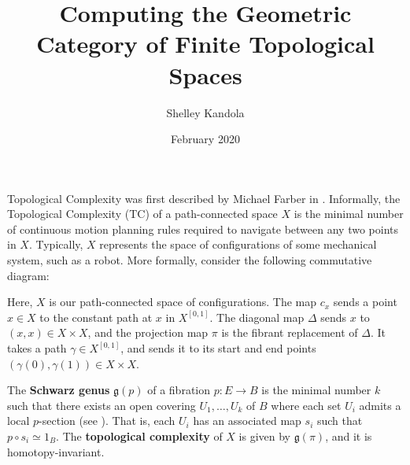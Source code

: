 \documentclass{article}
\title{Computing the Geometric Category of Finite Topological Spaces}
\author{Shelley Kandola}
\date{February 2020}
\begin{document}
\maketitle


Topological Complexity was first described by Michael Farber in \cite{Farber2001}.
Informally, the Topological Complexity (TC) of a path-connected space $X$ is the minimal number of continuous motion planning rules required to navigate between any two points in $X$. Typically, $X$ represents the space of configurations of some mechanical system, such as a robot.
More formally, consider the following commutative diagram:

\begin{center}
\end{center}


Here, $X$ is our path-connected space of configurations.
The map $c_x$ sends a point $x\in X$ to the constant path at $x$ in $X^{[0,1]}$.
The diagonal map $\Delta$ sends $x$ to $(x,x)\in X \times X$, and the projection map $\pi$ is the fibrant replacement of $\Delta$.
It takes a path $\gamma \in X^{[0,1]}$, and sends it to its start and end points $(\gamma(0),\gamma(1)) \in X \times X$.

The {\bf Schwarz genus} $\mathfrak{g}(p)$ of a fibration $p:E \to B$ is the minimal number $k$ such that there exists an open covering $U_1,\hdots,U_k$ of $B$ where each set $U_i$ admits a local $p$-section (see \cite{Schwarz1958}).
That is, each $U_i$ has an associated map $s_i$ such that $p \circ s_i \simeq 1_B$. The \textbf{topological complexity} of $X$ is given by $\mathfrak{g}(\pi)$, and it is homotopy-invariant.
\end{document}
